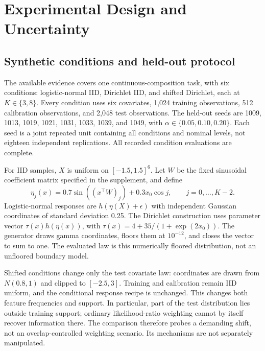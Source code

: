 \documentclass{article}
\begin{document}
\section{Experimental Design and Uncertainty}
\label{sec:design}
\subsection{Synthetic conditions and held-out protocol}
The available evidence covers one continuous-composition task, with six conditions: logistic-normal IID, Dirichlet IID, and shifted Dirichlet, each at $K\in\{3,8\}$. Every condition uses six covariates, 1,024 training observations, 512 calibration observations, and 2,048 test observations. The held-out seeds are 1009, 1013, 1019, 1021, 1031, 1033, 1039, and 1049, with $\alpha\in\{0.05,0.10,0.20\}$. Each seed is a joint repeated unit containing all conditions and nominal levels, not eighteen independent replications. All recorded condition evaluations are complete. %

For IID samples, $X$ is uniform on $[-1.5,1.5]^6$. Let $W$ be the fixed sinusoidal coefficient matrix specified in the supplement, and define
\begin{equation}
 \eta_j(x)=0.7\sin((x^\top W)_j)+0.3x_0\cos j,
 \qquad j=0,\ldots,K-2.
\end{equation}
Logistic-normal responses are $h(\eta(X)+\epsilon)$ with independent Gaussian coordinates of standard deviation 0.25. The Dirichlet construction uses parameter vector $\tau(x)h(\eta(x))$, with $\tau(x)=4+35/(1+\exp(2x_0))$. The generator draws gamma coordinates, floors them at $10^{-12}$, and closes the vector to sum to one. The evaluated law is this numerically floored distribution, not an unfloored boundary model. %

Shifted conditions change only the test covariate law: coordinates are drawn from $N(0.8,1)$ and clipped to $[-2.5,3]$. Training and calibration remain IID uniform, and the conditional response recipe is unchanged. This changes both feature frequencies and support. In particular, part of the test distribution lies outside training support; ordinary likelihood-ratio weighting cannot by itself recover information there. The comparison therefore probes a demanding shift, not an overlap-controlled weighting scenario. Its mechanisms are not separately manipulated.
\end{document}
